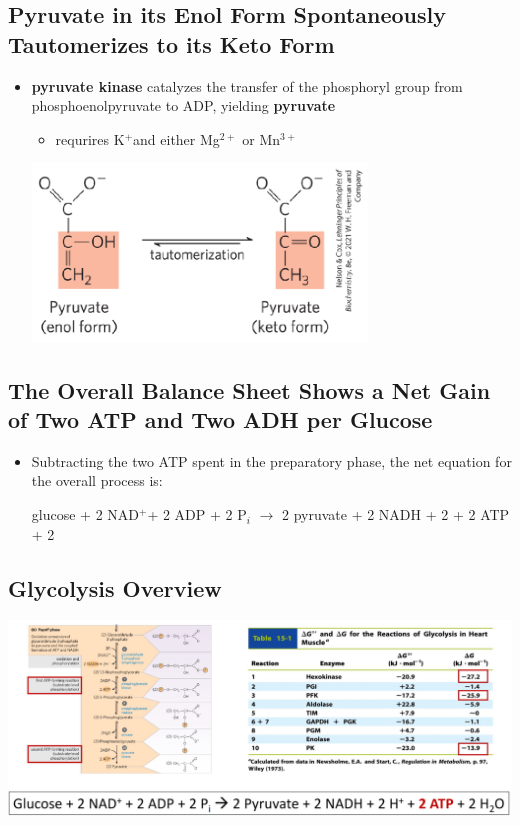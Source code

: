 \documentclass[10pt]{article}
\newcommand{\water}{\text{H$_2$O}}
\newcommand{\proton}{\text{H$^+$}}
\newcommand{\pc}{$^+$}
\begin{document}
\subsection*{Pyruvate in its Enol Form Spontaneously Tautomerizes to its Keto Form}
\begin{itemize}
	\item \textbf{pyruvate kinase} catalyzes the transfer of the phosphoryl group from phosphoenolpyruvate to ADP, yielding \textbf{pyruvate}
	\begin{itemize}
        \item requrires K\pc and either Mg$^{2+}$ or Mn$^{3+}$
    \end{itemize}
    \begin{center} 
        \includegraphics*[width=0.7\textwidth]{L1_22.png}
    \end{center}
\end{itemize}

\subsection*{The Overall Balance Sheet Shows a Net Gain of Two ATP and Two ADH per Glucose}
\begin{itemize}
	\item Subtracting the two ATP spent in the preparatory phase, the net equation for the overall process is:
	\begin{center} 
        glucose + 2 NAD\pc + 2 ADP + 2 P$_i$ $\rightarrow$ 2 pyruvate + 2 NADH + 2 \proton + 2 ATP + 2 \water
    \end{center}
\end{itemize}

\subsection*{Glycolysis Overview}
\begin{center} 
	\includegraphics*[width=\textwidth]{L1_23.png}
\end{center}
\end{document}
